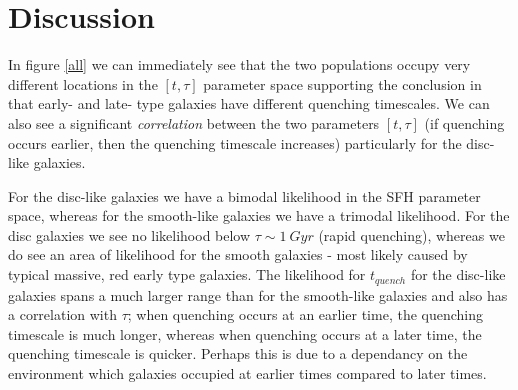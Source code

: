 \documentclass{mn2e}
\begin{document}
\section{Discussion}
In figure \ref{all} we can immediately see that the two populations occupy very different locations in the $[t, \tau]$ parameter space supporting the conclusion in \citet{Sch2014} that early- and late- type galaxies have different quenching timescales. We can also see a significant \emph{correlation} between the two parameters $[t, \tau]$ (if quenching occurs earlier, then the quenching timescale increases) particularly for the disc-like galaxies. 

For the disc-like galaxies we have a bimodal likelihood in the SFH parameter space, whereas for the smooth-like galaxies we have a trimodal likelihood. For the disc galaxies we see no likelihood below $\tau \sim 1~Gyr$ (rapid quenching), whereas we do see an area of likelihood for the smooth galaxies - most likely caused by typical massive, red early type galaxies. The likelihood for $t_{quench}$ for the disc-like galaxies spans a much larger range than for the smooth-like galaxies and also has a correlation with $\tau$; when quenching occurs at an earlier time, the quenching timescale is much longer, whereas when quenching occurs at a later time, the quenching timescale is quicker. Perhaps this is due to a dependancy on the environment which galaxies occupied at earlier times compared to later times. 
\end{document}
